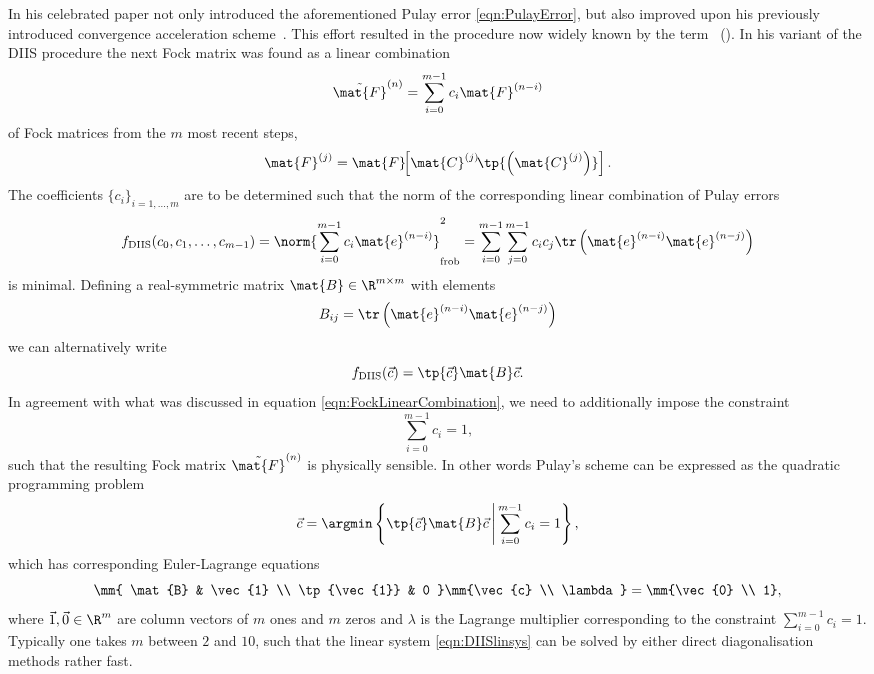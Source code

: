 In his celebrated \citeyear{Pulay1982} paper \citeauthor{Pulay1982}
not only introduced the aforementioned Pulay error \eqref{eqn:PulayError},
but also improved upon his previously introduced
\SCF convergence acceleration scheme~\cite{Pulay1980}.
This effort resulted in the procedure now widely known
by the term ~(\DIIS).
In his variant of the DIIS procedure the next Fock matrix was found
as a linear combination
\begin{equation}
	\tilde{\mat{F}}^{(n)} = \sum_{i=0}^{m-1} c_i \mat{F}^{(n-i)}
	\label{eqn:DIISfock}
\end{equation}
of Fock matrices from the $m$ most recent \SCF steps, \ie
\[ \mat{F}^{(j)}
	= \mat{F}\!\!\left[\mat{C}^{(j)}\!\tp{\left(\mat{C}^{(j)}\right)}\right].
\]
The coefficients $\{c_i\}_{i=1,\ldots,m}$ are to be determined such that
the norm of the corresponding linear combination of Pulay errors
\begin{equation}
	f_\text{DIIS}(c_0, c_1, \ldots, c_{m-1})
	= \norm{\sum_{i=0}^{m-1} c_i \mat{e}^{(n-i)}}_\text{frob}^2 
	= \sum_{i=0}^{m-1} \sum_{j=0}^{m-1} c_i c_j \tr\left( \mat{e}^{(n-i)} \mat{e}^{(n-j)}  \right)
\end{equation}
is minimal.
Defining a real-symmetric matrix $\mat{B} \in \R^{m\times m}$ with elements
\begin{equation}
	B_{ij} = \tr\left( \mat{e}^{(n-i)} \mat{e}^{(n-j)} \right)
	\label{eqn:BMatElem}
\end{equation}
we can alternatively write
\begin{equation}
	f_\text{DIIS}(\vec{c}) = \tp{\vec{c}} \mat{B} \vec{c}.
	\label{eqn:DIISobjective}
\end{equation}
In agreement with what was discussed in equation \eqref{eqn:FockLinearCombination},
we need to additionally impose the constraint
\[
	\sum_{i=0}^{m-1} c_i = 1,
\]
such that the resulting Fock matrix $\tilde{\mat{F}}^{(n)}$ is physically sensible.
In other words Pulay's \DIIS scheme can be expressed
as the quadratic programming problem
\[
	\vec{c} = \argmin\left\{
		\tp{\vec{c}} \mat{B} \vec{c}
		\, \middle| \,
		\sum_{i=0}^{m-1} c_i = 1
	\right\},
\]
which has corresponding Euler-Lagrange equations
\begin{equation}
	\mm{
		\mat{B} & \vec{1} \\
		\tp{\vec{1}} & 0
	}
	\mm{\vec{c} \\ \lambda}
	= \mm{\vec{0} \\ 1},
	\label{eqn:DIISlinsys}
\end{equation}
where $\vec{1}, \vec{0} \in \R^m$ are column vectors of $m$ ones and $m$ zeros
and $\lambda$ is the Lagrange multiplier corresponding to the constraint
$\sum_{i=0}^{m-1} c_i = 1$.
Typically one takes $m$ between $2$ and $10$,
such that the linear system \eqref{eqn:DIISlinsys} can be solved by either direct
diagonalisation methods rather fast.

